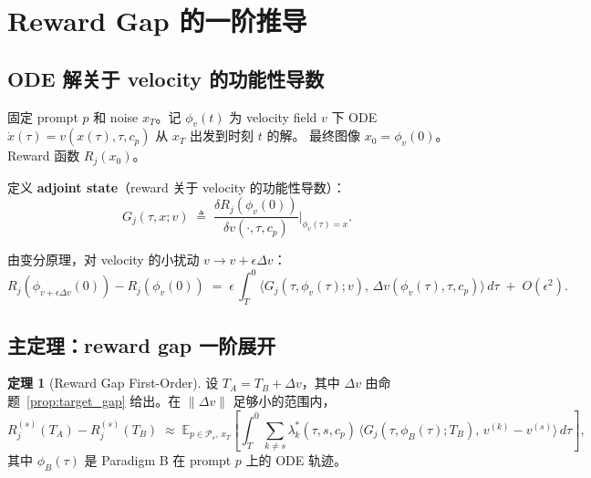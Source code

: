 \documentclass[11pt,a4paper]{article}
\newcommand{\E}{\mathbb{E}}
\theoremstyle{definition}
\newtheorem{theorem}{定理}
\begin{document}
\section{Reward Gap 的一阶推导}
\label{sec:reward_gap}

\subsection{ODE 解关于 velocity 的功能性导数}

固定 prompt $p$ 和 noise $x_T$。记 $\phi_v(t)$ 为 velocity field $v$ 下
ODE $\dot{x}(\tau) = v(x(\tau), \tau, c_p)$ 从 $x_T$ 出发到时刻 $t$ 的解。
最终图像 $x_0 = \phi_v(0)$。Reward 函数 $R_j(x_0)$。

定义 \textbf{adjoint state}（reward 关于 velocity 的功能性导数）：
\begin{equation}
G_j(\tau, x; v) \;\triangleq\; \frac{\delta R_j(\phi_v(0))}{\delta v(\cdot, \tau, c_p)}\bigg|_{\phi_v(\tau) = x}.
\label{eq:adjoint}
\end{equation}

由变分原理，对 velocity 的小扰动 $v \to v + \epsilon \Delta v$：
\begin{equation}
R_j(\phi_{v + \epsilon \Delta v}(0)) - R_j(\phi_v(0)) \;=\; \epsilon\,\int_T^0 \langle G_j(\tau, \phi_v(\tau); v),\,\Delta v(\phi_v(\tau), \tau, c_p)\rangle\,d\tau \;+\; O(\epsilon^2).
\label{eq:reward_taylor}
\end{equation}

\subsection{主定理：reward gap 一阶展开}

\begin{theorem}[Reward Gap First-Order]
\label{thm:linear_reward_gap}
设 $T_A = T_B + \Delta v$，其中 $\Delta v$ 由命题~\ref{prop:target_gap}
给出。在 $\|\Delta v\|$ 足够小的范围内，
\begin{equation}
R_j^{(s)}(T_A) - R_j^{(s)}(T_B)
\;\approx\;
\E_{p \in \mathcal{P}_s,\,x_T}\!\left[
\int_T^0 \!\sum_{k \neq s} \lambda_k^*(\tau, s, c_p)\,\langle G_j(\tau, \phi_B(\tau); T_B),\,v^{(k)} - v^{(s)}\rangle\,d\tau
\right],
\label{eq:linear_reward_gap}
\end{equation}
其中 $\phi_B(\tau)$ 是 Paradigm B 在 prompt $p$ 上的 ODE 轨迹。
\end{theorem}
\end{document}
